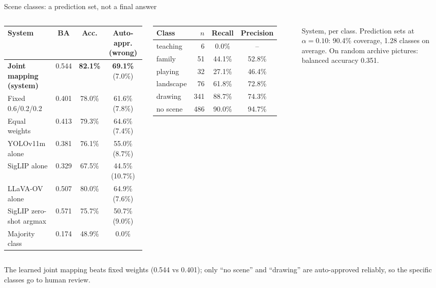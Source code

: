 \documentclass[aspectratio=169,10pt]{beamer}
\newcommand{\takeaway}[1]{\vfill\begin{keybox}#1\end{keybox}}
\begin{document}
\begin{frame}{Scene classes: a prediction set, not a final answer}
\begin{columns}[T,onlytextwidth]
\scriptsize\renewcommand{\arraystretch}{1.15}
\begin{tabular}{@{}l c c c@{}}
\toprule
System & BA & Acc. & Auto-appr. (wrong)\\
\midrule
\textbf{Joint mapping (system)} & 0.544 & \textbf{82.1\%} & \textbf{69.1\%} (7.0\%)\\
Fixed 0.6/0.2/0.2 & 0.401 & 78.0\% & 61.6\% (7.8\%)\\
Equal weights & 0.413 & 79.3\% & 64.6\% (7.4\%)\\
YOLOv11m alone & 0.381 & 76.1\% & 55.0\% (8.7\%)\\
SigLIP alone & 0.329 & 67.5\% & 44.5\% (10.7\%)\\
LLaVA-OV alone & 0.507 & 80.0\% & 64.9\% (7.6\%)\\
SigLIP zero-shot argmax & 0.571 & 75.7\% & 50.7\% (9.0\%)\\
Majority class & 0.174 & 48.9\% & 0.0\%\\
\bottomrule
\end{tabular}
\scriptsize\renewcommand{\arraystretch}{1.15}
\begin{tabular}{@{}l r c c@{}}
\toprule
Class & $n$ & Recall & Precision\\
\midrule
teaching & 6 & 0.0\% & --\\
family & 51 & 44.1\% & 52.8\%\\
playing & 32 & 27.1\% & 46.4\%\\
landscape & 76 & 61.8\% & 72.8\%\\
drawing & 341 & 88.7\% & 74.3\%\\
no scene & 486 & 90.0\% & 94.7\%\\
\bottomrule
\end{tabular}\par\vspace{3pt}
{\scriptsize System, per class. Prediction sets at $\alpha=0.10$: 90.4\% coverage, 1.28 classes on average. On random archive pictures: balanced accuracy 0.351.}
\end{columns}
\takeaway{The learned joint mapping beats fixed weights (0.544 vs 0.401); only ``no scene'' and ``drawing'' are auto-approved reliably, so the specific classes go to human review.}
\end{frame}
\end{document}
